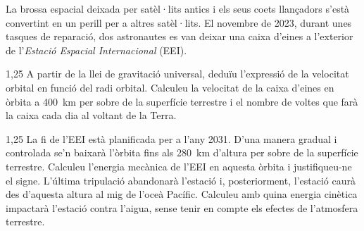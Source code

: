 La brossa espacial deixada per satèl·lits antics i els seus coets llançadors s'està convertint en un perill per a altres satèl·lits. El novembre de 2023, durant unes tasques de reparació, dos astronautes es van deixar una caixa d'eines a l'exterior de l'\textit{Estació Espacial Internacional} (EEI).

\begin{apartat}{1,25}
A partir de la llei de gravitació universal, deduïu l'expressió de la velocitat orbital en funció del radi orbital. Calculeu la velocitat de la caixa d'eines en òrbita a 400~km per sobre de la superfície terrestre i el nombre de voltes que farà la caixa cada dia al voltant de la Terra.
\end{apartat}

\begin{apartat}{1,25}
La fi de l'EEI està planificada per a l'any 2031. D'una manera gradual i controlada se'n baixarà l'òrbita fins als 280~km d'altura per sobre de la superfície terrestre. Calculeu l'energia mecànica de l'EEI en aquesta òrbita i justifiqueu-ne el signe. L'última tripulació abandonarà l'estació i, posteriorment, l'estació caurà des d'aquesta altura al mig de l'oceà Pacífic. Calculeu amb quina energia cinètica impactarà l'estació contra l'aigua, sense tenir en compte els efectes de l'atmosfera terrestre.
\end{apartat}

